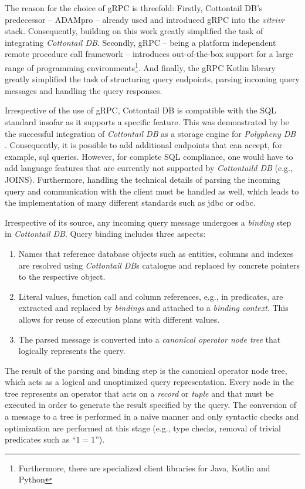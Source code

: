 The reason for the choice of gRPC is threefold: Firstly, Cottontail DB's predecessor -- ADAMpro -- already used and introduced gRPC into the \emph{vitrivr} stack. Consequently, building on this work greatly simplified the task of integrating \emph{Cottontail DB}. Secondly, gRPC -- being a platform independent remote procedure call framework -- introduces out-of-the-box support for a large range of programming environments\footnote{Furthermore, there are specialized client libraries for Java, Kotlin and Python}. And finally, the gRPC Kotlin library greatly simplified the task of structuring query endpoints, parsing incoming query messages and handling the query responses.

Irrespective of the use of gRPC, Cottontail DB is compatible with the SQL standard insofar as it supports a specific feature. This was demonstrated by be the successful integration of \emph{Cottontail DB} as a storage engine for \emph{Polypheny DB} . Consequently, it is possible to add additional endpoints that can accept, for example, \acrshort{sql} queries. However, for complete SQL compliance, one would have to add language features that are currently not supported by \emph{Cottontaild DB} (e.g., JOINS). Furthermore, handling the technical details of parsing the incoming query and communication with the client must be handled as well, which leads to the implementation of many different standards such as \acrshort{jdbc} or \acrshort{odbc}.

Irrespective of its source, any incoming query message undergoes a \emph{binding} step in \emph{Cottontail DB}. Query binding includes three aspects:

\begin{enumerate}
    \item Names that reference database objects such as entities, columns and indexes are resolved using \emph{Cottontail DB}s catalogue and replaced by concrete pointers to the respective object.
    \item Literal values, function call and column references, e.g., in predicates, are extracted and replaced by \emph{bindings} and attached to a \emph{binding context}. This allows for reuse of execution plans with different values.
    \item The parsed message is converted into a \emph{canonical operator node tree} that logically represents the query.
\end{enumerate}

The result of the parsing and binding step is the canonical operator node tree, which acts as a logical and unoptimized query representation.  Every node in the tree represents an operator that acts on a \emph{record} or \emph{tuple} and that must be executed in order to generate the result specified by the query. The conversion of a message to a tree is performed in a naive manner and only syntactic checks and optimization are performed at this stage (e.g., type checks, removal of trivial predicates such as ``$1 = 1$'').

